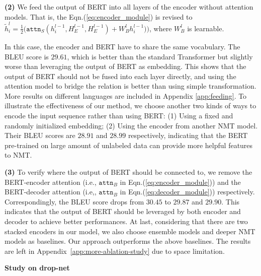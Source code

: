 \documentclass{article} \usepackage{iclr2020_conference,times}
\newcommand{\attn}{\texttt{attn}}
\newcommand{\myeqref}[1]{Eqn.(\ref{#1})}
\begin{document}
\noindent\textbf{(2)} We feed the output of BERT into all layers of the encoder without attention models. That is, the \myeqref{eq:encoder_module} is revised to $\tilde{h}^l_i=\frac{1}{2}\big(\attn_S(h^{l-1}_i,H^{l-1}_E,H^{l-1}_E) + W^l_Bh^{l-1}_i)\big)$, where $W_B^l$ is learnable.
\iffalse
\begin{small}
\begin{equation}
\tilde{h}^l_i=\frac{1}{2}\big(\attn_S(h^{l-1}_i,H^{l-1}_E,H^{l-1}_E) + W^l_Bh^{l-1}_i)\big),\,\forall i\in[l_x],\;W_B^l\text{ is learnable}.
\label{eq:encoder_ELMo_resnet}
\end{equation}
\end{small}
\fi
In this case, the encoder and BERT have to share the same vocabulary. The BLEU score is $29.61$, which is better than the standard Transformer but slightly worse than leveraging the output of BERT as embedding. This shows that the output of BERT should not be fused into each layer directly, and using the attention model to bridge the relation is better than using simple transformation. More results on different languages are included in Appendix \ref{app:feeding}.
To illustrate the effectiveness of our method, we choose another two kinds of ways to encode the input sequence rather than using BERT: (1) Using a fixed and randomly initialized embedding; (2) Using the encoder from another NMT model. Their BLEU scores are $28.91$ and $28.99$ respectively, indicating that the BERT pre-trained on large amount of unlabeled data can provide more helpful features to NMT.


\noindent\textbf{(3)} To verify where the output of BERT should be connected to, we remove the BERT-encoder attention (i.e., $\attn_B$ in \myeqref{eq:encoder_module}) and the BERT-decoder attention (i.e,, $\attn_B$ in \myeqref{eq:decoder_module}) respectively. Correspondingly, the BLEU score drops from $30.45$ to $29.87$ and $29.90$. This indicates that the output of BERT should be leveraged by both encoder and decoder to achieve better performances.
At last, considering that there are two stacked encoders in our model, we also choose ensemble models and deeper NMT models as baselines. Our approach outperforms the above baselines. The results are left in Appendix~\ref{app:more-ablation-study} due to space limitation.

\noindent\textbf{Study on drop-net}
\end{document}
